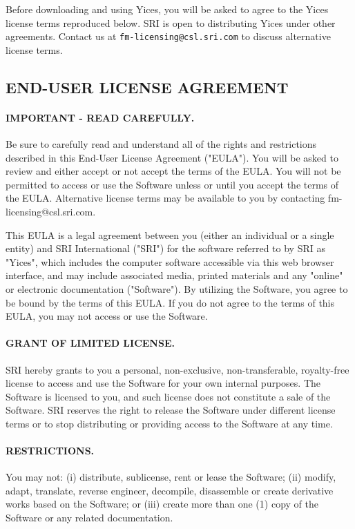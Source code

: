\documentclass[11pt,twoside,fleqn,openright,titlepage]{cslreport}
\begin{document}
Before downloading and using Yices, you will be asked to agree to the
Yices license terms reproduced below. SRI is open to distributing
Yices under other agreements. Contact us at
\texttt{fm-licensing@csl.sri.com} to discuss alternative license
terms.

\begin{small}
\subsection*{END-USER LICENSE AGREEMENT}

\paragraph{IMPORTANT - READ CAREFULLY.}  Be  sure to carefully read and
understand all of the rights and restrictions described in this
End-User License Agreement ("EULA").  You will be asked to review and
either accept or not accept the terms of the EULA.  You will not be
permitted to access or use the Software unless or until you accept the
terms of the EULA.  Alternative license terms may be available to you
by contacting fm-licensing@csl.sri.com.

This EULA is a legal agreement  between you (either an individual or a
single entity) and SRI International ("SRI") for the software referred
to by SRI as "Yices",  which includes the computer software accessible
via  this web  browser interface,  and may  include  associated media,
printed  materials  and   any  "online"  or  electronic  documentation
("Software").  By utilizing the Software, you agree to be bound by the
terms of this  EULA.  If you do  not agree to the terms  of this EULA,
you may not access or use the Software.

\paragraph{GRANT  OF LIMITED  LICENSE.}   SRI  hereby grants  to  you a
 personal,  non-exclusive, non-transferable,  royalty-free license  to
 access  and use  the Software  for your  own internal  purposes.  The
 Software is licensed  to you, and such license does  not constitute a
 sale of the Software.  SRI reserves the right to release the Software
 under different  license terms or  to stop distributing  or providing
 access to the Software at any time.

\paragraph{RESTRICTIONS.} You may not:  (i) distribute, sublicense, rent
or lease the Software; (ii) modify, adapt, translate, reverse
engineer, decompile, disassemble or create derivative works based on
the Software; or (iii) create more than one (1) copy of the Software
or any related documentation.


\end{small}
\end{document}
